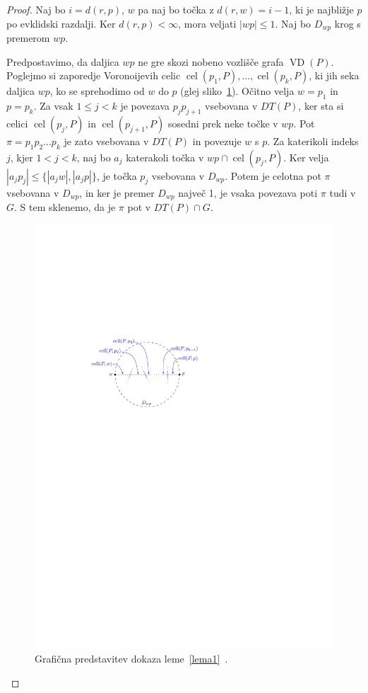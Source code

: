\documentclass[a4paper, 12pt]{book}
\begin{document}
\begin{proof}
Naj bo $i = d(r,p)$, $w$ pa naj bo točka z $d(r,w) = i - 1$, ki je najbližje $p$ po evklidski razdalji. Ker $d(r,p) < \infty$, mora veljati $|wp| \leq 1$. Naj bo $D_{wp}$ krog s premerom $wp$.

Predpostavimo, da daljica $wp$ ne gre skozi nobeno vozlišče grafa $\operatorname{VD}(P)$. Poglejmo si zaporedje Voronoijevih celic $\operatorname{cel}(p_1, P),..., \operatorname{cel}(p_k, P)$, ki jih seka daljica $wp$, ko se sprehodimo od $w$ do $p$ (glej sliko~\ref{c1c2}). Očitno velja $w = p_1$ in $p = p_k$. Za vsak $1 \leq j < k$ je povezava $p_jp_{j+1}$ vsebovana v $DT(P)$, ker sta si celici $\operatorname{cel}(p_j, P)$ in $\operatorname{cel}(p_{j+1}, P)$ sosedni prek neke točke v $wp$. Pot $\pi = p_1p_2...p_k$ je zato vsebovana v $DT(P)$ in povezuje $w$ s $p$. Za katerikoli indeks $j$, kjer $1 < j < k$, naj bo $a_j$ katerakoli točka v $wp \cap \operatorname{cel}(p_j, P)$. Ker velja $|a_jp_j| \leq \{|a_jw|, |a_jp|\}$, je točka $p_j$ vsebovana v $D_{wp}$. Potem je celotna pot $\pi$ vsebovana v $D_{wp}$, in ker je premer $D_{wp}$ največ 1, je vsaka povezava poti $\pi$ tudi v $G$. S tem sklenemo, da je $\pi$ pot v $DT(P) \cap G$.

\begin{figure}[htp]
\centerline{\includegraphics[scale=1]{pics/path.pdf}}
\caption{Grafična predstavitev dokaza leme~\ref{lema1}~\cite{CJ15}.}
\label{c1c2}
\end{figure}


\end{proof}
\end{document}
